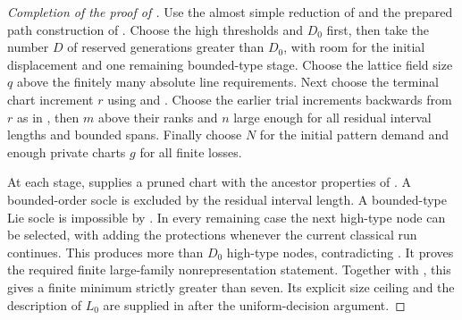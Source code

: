 \begin{proof}[Completion of the proof of ]
Use the almost simple reduction of  and the prepared path construction of . Choose the high thresholds and $D_0$ first, then take the number $D$ of reserved generations greater than $D_0$, with room for the initial displacement and one remaining bounded-type stage. Choose the lattice field size $q$ above the finitely many absolute line requirements. Next choose the terminal chart increment $r$ using  and . Choose the earlier trial increments backwards from $r$ as in , then $m$ above their ranks and $n$ large enough for all residual interval lengths and bounded spans. Finally choose $N$ for the initial pattern demand and enough private charts $g$ for all finite losses.

At each stage,  supplies a pruned chart with the ancestor properties of . A bounded-order socle is excluded by the residual interval length. A bounded-type Lie socle is impossible by . In every remaining case the next high-type node can be selected, with  adding the protections whenever the current classical run continues. This produces more than $D_0$ high-type nodes, contradicting . It proves the required finite large-family nonrepresentation statement. Together with , this gives a finite minimum strictly greater than seven. Its explicit size ceiling and the description of $L_0$ are supplied in  after the uniform-decision argument.
\end{proof}
